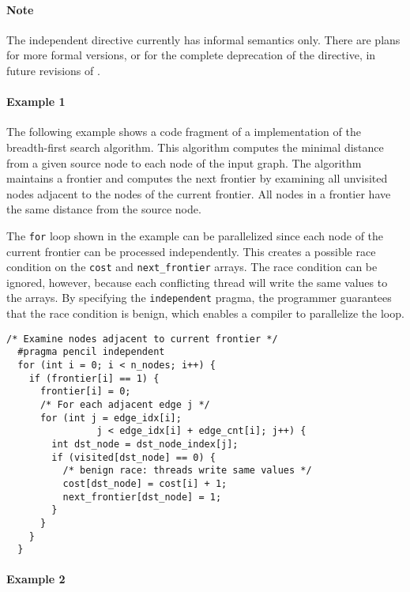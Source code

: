 \paragraph{Note}
The independent directive currently has informal semantics only. There
are plans for more formal versions, or for the complete deprecation of
the directive, in future revisions of \pencil.

\paragraph{Example 1}
  The following example shows a code fragment of a \pencil
  implementation of the breadth-first search algorithm.
  This algorithm computes the minimal distance from a given source node to
  each node of the input graph.
  The algorithm maintains a frontier and computes the next frontier by examining
  all unvisited nodes adjacent to the nodes of the current frontier.
  All nodes in a frontier have the same distance from the source node.

  The \lstinline|for| loop shown in the example can be
  parallelized since each node of the current frontier can be processed
  independently.
  This creates a possible race condition on the \lstinline|cost| and
  \lstinline|next_frontier| arrays.
  The race condition can be ignored, however, because each conflicting thread
  will write the same values to the arrays.
  By specifying the \lstinline|independent| pragma, the programmer guarantees
  that the race condition is benign, which enables a \pencil compiler to
  parallelize the loop.

  \begin{lstlisting}[language=pencil]
  /* Examine nodes adjacent to current frontier */
  #pragma pencil independent
  for (int i = 0; i < n_nodes; i++) {
    if (frontier[i] == 1) {
      frontier[i] = 0;
      /* For each adjacent edge j */
      for (int j = edge_idx[i];
                j < edge_idx[i] + edge_cnt[i]; j++) {
        int dst_node = dst_node_index[j];
        if (visited[dst_node] == 0) {
          /* benign race: threads write same values */
          cost[dst_node] = cost[i] + 1;
          next_frontier[dst_node] = 1;
        }
      }
    }
  }
  \end{lstlisting}

\paragraph{Example 2}


